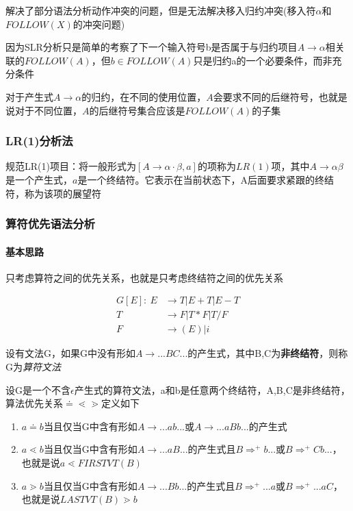 \documentclass[UTF8]{ctexart} %
\begin{document}
解决了部分语法分析动作冲突的问题，但是无法解决移入归约冲突(移入符$\alpha$和$FOLLOW(X)$的冲突问题)

因为SLR分析只是简单的考察了下一个输入符号b是否属于与归约项目$A\rightarrow \alpha$相关联的$FOLLOW(A)$，但$b\in FOLLOW(A)$只是归约a的一个必要条件，而非充分条件

对于产生式$A\rightarrow \alpha$的归约，在不同的使用位置，$A$会要求不同的后继符号，也就是说对于不同位置，$A$的后继符号集合应该是$FOLLOW(A)$的子集

\subsubsection{LR(1)分析法}

规范LR(1)项目：将一般形式为$[A\rightarrow \alpha\cdot\beta,a]$的项称为$LR(1)$项，其中$A\rightarrow \alpha\beta$是一个产生式，$a$是一个终结符。它表示在当前状态下，A后面要求紧跟的终结符，称为该项的展望符

\subsubsection{算符优先语法分析}

\paragraph{基本思路} 只考虑算符之间的优先关系，也就是只考虑终结符之间的优先关系

\begin{equation}
    \begin{aligned}
        G[E]:\ E & \rightarrow T|E+T|E-T \\
        T        & \rightarrow F|T*F|T/F \\
        F        & \rightarrow (E)|i
    \end{aligned}
\end{equation}

设有文法G，如果G中没有形如$A\rightarrow ...BC...$的产生式，其中B,C为\textbf{非终结符}，则称G为\emph{算符文法}

设G是一个不含$\epsilon$产生式的算符文法，a和b是任意两个终结符，A,B,C是非终结符，算法优先关系$\doteq \lessdot \gtrdot $定义如下

\begin{enumerate}
    \item $a\doteq b$当且仅当G中含有形如$A\rightarrow ...ab...$或$A\rightarrow ...aBb...$的产生式
    \item $a\lessdot b$当且仅当G中含有形如$A\rightarrow ...aB...$的产生式且$B\Rightarrow^+ b...$或$B\Rightarrow^+ Cb...$，也就是说$a\lessdot FIRSTVT(B)$
    \item $a\gtrdot b$当且仅当G中含有形如$A\rightarrow ...Bb...$的产生式且$B\Rightarrow^+ ...a$或$B\Rightarrow^+ ...aC$，也就是说$LASTVT(B)\gtrdot b$
\end{enumerate}
\end{document}
